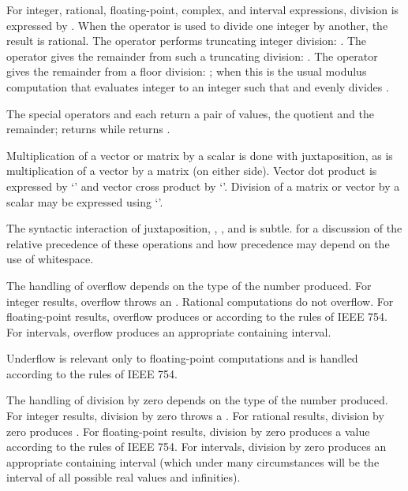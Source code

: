 For integer, rational, floating-point, complex, and interval expressions, division is expressed by \EXP{/}.
When the operator \EXP{/} is used to divide one integer by another,
the result is rational.
The operator \EXP{\div} performs truncating integer division:
.
The operator  gives the remainder from such a truncating division:
.
The operator  gives the remainder from a floor division:
;
when  this is the usual modulus computation that evaluates integer 
to an integer  such that  and  evenly divides .

The special operators  and  each return a pair of values,
the quotient and the remainder;  returns
 while
 returns
.

Multiplication of a vector or matrix by a scalar is done with juxtaposition,
as is multiplication of a vector by a matrix (on either side).  Vector dot product
is expressed by `\EXP{\cdot}' and vector cross product by
`\EXP{\times}'.  Division of
a matrix or vector by a scalar may be expressed using `\EXP{/}'.

The syntactic interaction of juxtaposition, \EXP{\cdot}, \EXP{\times},
and \EXP{/} is subtle.
 for a discussion of the relative precedence of
these operations and how precedence may depend on the use of whitespace.

The handling of overflow depends on the type of the number produced.
For integer results, overflow throws an .
Rational computations do not overflow.
For floating-point results, overflow produces \EXP{+\infty} or \EXP{-\infty}
according to the rules of IEEE 754.
For intervals, overflow produces an appropriate containing interval.

Underflow is relevant only to floating-point computations and is handled
according to the rules of IEEE 754.

The handling of division by zero depends on the type of the number produced.
For integer results, division by zero throws a .
For rational results, division by zero produces .
For floating-point results, division by zero produces a  value
according to the rules of IEEE 754.
For intervals, division by zero produces an appropriate containing interval
(which under many circumstances will be the interval of all possible real values and infinities).

